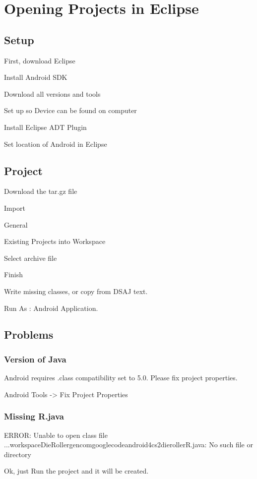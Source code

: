 \chapter{Opening Projects in Eclipse}
\section{Setup}
First, download Eclipse

Install Android SDK

Download all versions and tools

Set up so Device can be found on computer

Install Eclipse ADT Plugin

Set location of Android in Eclipse

\section{Project}

Download the tar.gz file

Import

General

Existing Projects into Workspace

Select archive file

Finish

Write missing classes, or copy from DSAJ text.

Run As : Android Application.

\section{Problems}

\subsection{Version of Java}
Android requires .class compatibility set to 5.0. Please fix project properties.

Android Tools -> Fix Project Properties

\subsection{Missing R.java}

ERROR: Unable to open class file \/...\/workspace\/DieRoller\/gen\/com\/googlecode\/android4cs2\/dieroller\/R.java: No such file or directory

Ok, just Run the project and it will be created.

